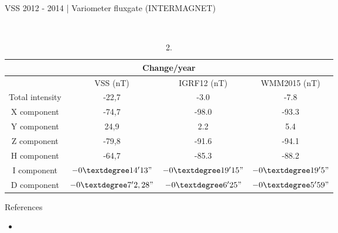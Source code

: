 \documentclass[final,t]{beamer}
\begin{document}
\begin{columns}[t]
\begin{column}{.33\linewidth}
\begin{block}{VSS}
	 2012 - 2014 | Variometer fluxgate (INTERMAGNET)


\\

\begin{table}
\begin{tabular}{|c|c|c|c|}
		\hline
		\multicolumn{4}{|c|}{\textbf{Change/year}}\\	
	\hline   & VSS (nT)& IGRF12 (nT) & WMM2015 (nT)\\ 
	\hline Total intensity & -22,7  & -3.0  & -7.8  \\ 
	\hline X component & -74,7 & -98.0 & -93.3 \\ 
	\hline Y component & 24,9  & 2.2 & 5.4 \\ 
	\hline Z component & -79,8 & -91.6  & -94.1\\ 
	\hline H component  & -64,7 & -85.3 & -88.2\\ 
	\hline I component  & $-0° 14' 13"$ & $-0° 19' 15"$ &$-0° 19' 5"$\\ 
	\hline D component  & $-0° 7' 2,28"$ & $-0° 6' 25"$ &$ -0° 5' 59"$\\ 
	\hline 
\end{tabular} 
\caption{2. }
\end{table}		
\end{block}


% 
%



\begin{block}{References}

\begin{itemize}
\item
\end{itemize}
\vspace{-0.2cm}
\end{block}

\end{column}

\end{columns}
\end{document}
